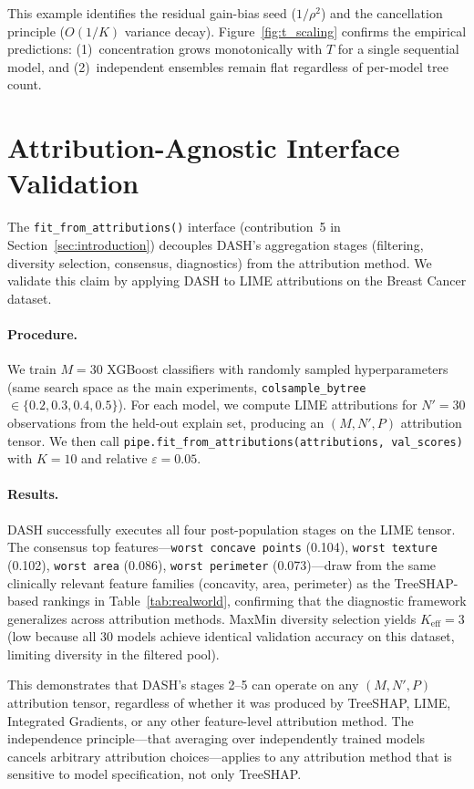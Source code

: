 \documentclass[11pt]{article}
\newcommand{\dash}{\textsc{DASH}}
\begin{document}
This example identifies the residual gain-bias seed ($1/\rho^2$)
and the cancellation principle ($O(1/K)$ variance decay).
Figure~\ref{fig:t_scaling} confirms the empirical predictions:
(1)~concentration grows monotonically with $T$ for a single sequential
model, and (2)~independent ensembles remain flat regardless of
per-model tree count.


\section{Attribution-Agnostic Interface Validation}
\label{app:lime_demo}

The \texttt{fit\_from\_attributions()} interface (contribution~5 in
Section~\ref{sec:introduction}) decouples \dash{}'s aggregation stages
(filtering, diversity selection, consensus, diagnostics) from the
attribution method. We validate this claim by applying \dash{} to LIME
\citep{ribeiro2016lime} attributions on the Breast Cancer dataset.

\paragraph{Procedure.}
We train $M = 30$ XGBoost classifiers with randomly sampled
hyperparameters (same search space as the main experiments,
\texttt{colsample\_bytree} $\in \{0.2, 0.3, 0.4, 0.5\}$).
For each model, we compute LIME attributions for $N' = 30$ observations
from the held-out explain set, producing an $(M, N', P)$ attribution
tensor. We then call
\texttt{pipe.fit\_from\_attributions(attributions, val\_scores)} with
$K = 10$ and relative $\varepsilon = 0.05$.

\paragraph{Results.}
\dash{} successfully executes all four post-population stages on the
LIME tensor. The consensus top features---\texttt{worst concave points}
(0.104), \texttt{worst texture} (0.102), \texttt{worst area} (0.086),
\texttt{worst perimeter} (0.073)---draw from the same clinically
relevant feature families (concavity, area, perimeter) as the
TreeSHAP-based rankings in Table~\ref{tab:realworld}, confirming that
the diagnostic framework generalizes across attribution methods.
MaxMin diversity selection yields $K_{\text{eff}} = 3$ (low because all
30 models achieve identical validation accuracy on this dataset,
limiting diversity in the filtered pool).

This demonstrates that \dash{}'s stages 2--5 can operate on any
$(M, N', P)$ attribution tensor, regardless of whether it was produced
by TreeSHAP, LIME, Integrated Gradients, or any other feature-level
attribution method. The independence principle---that averaging over
independently trained models cancels arbitrary attribution
choices---applies to any attribution method that is sensitive to model
specification, not only TreeSHAP.
\end{document}
